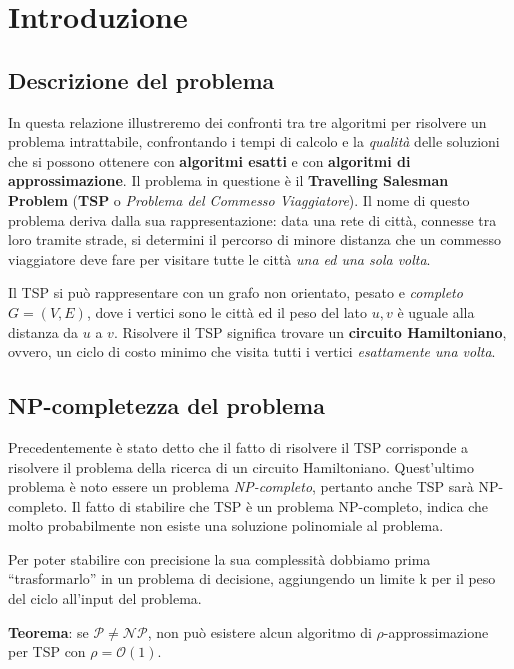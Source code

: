 \section{Introduzione}

\subsection{Descrizione del problema}

In questa relazione illustreremo dei confronti tra tre algoritmi per risolvere un problema
intrattabile, confrontando i tempi di calcolo e la \textit{qualità} delle soluzioni
che si possono ottenere con \textbf{algoritmi esatti} e con \textbf{algoritmi di approssimazione}.
Il problema in questione è il \textbf{Travelling Salesman Problem} (\textbf{TSP} o
\textit{Problema del Commesso Viaggiatore}). Il nome di questo problema deriva dalla sua
rappresentazione: data una rete di città, connesse tra loro tramite strade, si determini il
percorso di minore distanza che un commesso viaggiatore deve fare per visitare tutte le città
\textit{una ed una sola volta}.

Il TSP si può rappresentare con un grafo non orientato, pesato e
\textit{completo} $G = (V,E)$, dove i vertici sono le città ed il peso del lato ${u,v}$
è uguale alla distanza da $u$ a $v$. Risolvere il TSP significa trovare un
\textbf{circuito Hamiltoniano}, ovvero, un ciclo di costo minimo che visita tutti
i vertici \textit{esattamente una volta}.

\subsection{NP-completezza del problema}

Precedentemente è stato detto che il fatto di risolvere il TSP corrisponde a risolvere
il problema della ricerca di un circuito Hamiltoniano. Quest'ultimo problema è noto
essere un problema \textit{NP-completo}, pertanto anche TSP sarà NP-completo.
Il fatto di stabilire che TSP è un problema NP-completo, indica che molto probabilmente
non esiste una soluzione polinomiale al problema.

Per poter stabilire con precisione la sua complessità dobbiamo prima
“trasformarlo” in un problema di decisione, aggiungendo un limite k per il peso del ciclo
all’input del problema.

\textbf{Teorema}: se $\mathcal{P} \ne \mathcal{NP}$, non può esistere alcun algoritmo
di $\rho$-approssimazione per TSP con $\rho = \mathcal{O}(1)$.

